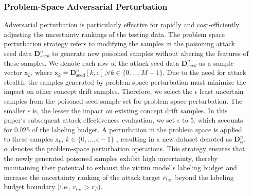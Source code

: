 \subsubsection{Problem-Space Adversarial Perturbation}
\label{Sec: Strategy I-Problem-Space Perturbation}
Adversarial perturbation is particularly effective for rapidly and cost-efficiently adjusting the uncertainty rankings of the testing data.
The problem space perturbation strategy refers to modifying the samples in the poisoning attack seed data $\bm{D}_{seed}^{n}$ to generate new poisoned samples without altering the features of these samples.
We denote each row of the attack seed data $\bm{D}_{seed}^{n}$ as a sample vector $\bm{\mathrm{x}}_{k}$, where $\bm{\mathrm{x}}_{k} = \bm{D}_{\text{seed}}^{n}[k,:]$,$\forall k \in \{0, \dots, M-1 \}$.
Due to the need for attack stealth, the samples generated by problem space perturbation must minimize the impact on other concept drift samples. 
Therefore, we select the $\epsilon$ least uncertain samples from the poisoned seed sample set for problem space perturbation. 
The smaller $\epsilon$ is, the lesser the impact on existing concept drift samples.
In this paper's subsequent attack effectiveness evaluation, we set $\epsilon$ to 5, which accounts for 0.025 of the labeling budget.
A perturbation in the problem space is applied to these samples $\bm{\mathrm{x}}_{k}$, $k \in \{0, \dots,  \epsilon-1 \}$ , resulting in a new dataset denoted as $\bm{D}_{\alpha}^{n}$.
$\alpha$ denotes the problem-space perturbation operations.
This strategy ensures that the newly generated poisoned samples exhibit high uncertainty, thereby maintaining their potential to exhaust the victim model’s labeling budget and increase the uncertainty ranking of the attack target $r_{tar}$ beyond the labeling budget boundary (i.e., $r_{tar} > r_{\beta}$).
